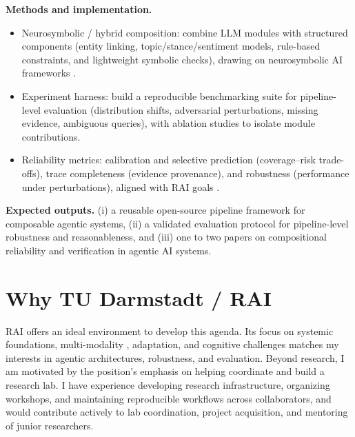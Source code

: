 \documentclass{nfr}
\begin{document}
\noindent
\textbf{Methods and implementation.}
\begin{itemize}
    \item Neurosymbolic / hybrid composition: combine LLM modules with structured components (entity linking, topic/stance/sentiment models, rule-based constraints, and lightweight symbolic checks), drawing on neurosymbolic AI frameworks \citep{d2009neural, serafini2016logic, rocktaschel2017end, nawaz2025review}.
    \item Experiment harness: build a reproducible benchmarking suite for pipeline-level evaluation (distribution shifts, adversarial perturbations, missing evidence, ambiguous queries), with ablation studies to isolate module contributions.
    \item Reliability metrics: calibration and selective prediction (coverage--risk trade-offs), trace completeness (evidence provenance), and robustness (performance under perturbations), aligned with RAI goals \citep{doshi2017towards}.
\end{itemize}

\noindent
\textbf{Expected outputs.} (i) a reusable open-source pipeline framework for composable agentic systems, (ii) a validated evaluation protocol for pipeline-level robustness and reasonableness, and (iii) one to two papers on compositional reliability and verification in agentic AI systems.

\section*{Why TU Darmstadt / RAI}

RAI offers an ideal environment to develop this agenda. Its focus on systemic foundations, multi-modality \citep{alayrac2022flamingo, li2023llava}, adaptation, and cognitive challenges \citep{rabinowitz2018machine} matches my interests in agentic architectures, robustness, and evaluation. Beyond research, I am motivated by the position's emphasis on helping coordinate and build a research lab. I have experience developing research infrastructure, organizing workshops, and maintaining reproducible workflows across collaborators, and would contribute actively to lab coordination, project acquisition, and mentoring of junior researchers.


\end{document}
